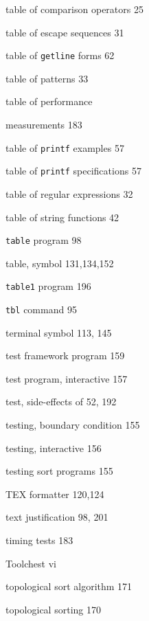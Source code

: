 \begin{multicols}{3}
\hangindent=4pc  table of comparison operators 25

\hangindent=4pc  table of escape sequences 31

\hangindent=4pc  table of \verb'getline' forms 62

\hangindent=4pc  table of patterns 33

\hangindent=4pc  table of performance

\hangindent=4pc  measurements 183

\hangindent=4pc  table of \verb'printf' examples 57

\hangindent=4pc  table of \verb'printf' specifications 57

\hangindent=4pc  table of regular expressions 32

\hangindent=4pc  table of string functions 42

\hangindent=4pc  \verb'table' program 98

\hangindent=4pc  table, symbol 131,134,152

\hangindent=4pc  \verb'table1' program 196

\hangindent=4pc  \verb'tbl' command 95

\hangindent=4pc  terminal symbol 113, 145

\hangindent=4pc  test framework program 159

\hangindent=4pc  test program, interactive 157

\hangindent=4pc  test, side-effects of 52, 192

\hangindent=4pc  testing, boundary condition 155

\hangindent=4pc  testing, interactive 156

\hangindent=4pc  testing sort programs 155

\hangindent=4pc  TEX formatter 120,124

\hangindent=4pc  text justification 98, 201

\hangindent=4pc  timing tests 183

\hangindent=4pc  Toolchest vi

\hangindent=4pc  topological sort algorithm 171

\hangindent=4pc  topological sorting 170


\end{multicols}
